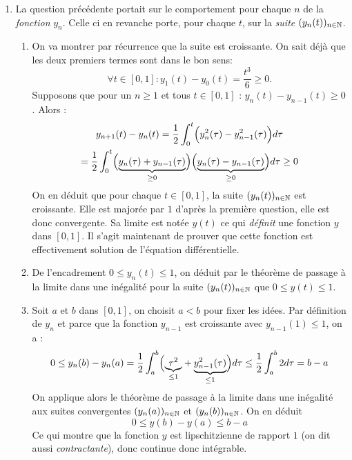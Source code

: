 \begin{enumerate}
\item La question précédente portait sur le comportement pour chaque $n$ de la \emph{fonction} $y_n$. Celle ci en revanche porte, pour chaque $t$, sur la \emph{suite} $(y_n(t))_{n\in \mathbb{N}}$. 
\begin{enumerate}
 \item On va montrer par récurrence que la suite est croissante. On sait déjà que les deux premiers termes sont dans le bon sens:
\begin{displaymath}
 \forall t\in [0,1] : y_1(t) - y_0(t) = \frac{t^3}{6} \geq 0.
\end{displaymath}
Supposons que pour un $n\geq 1$ et tous $t\in[0,1]$ : $y_n(t) - y_{n-1}(t)\geq 0$. Alors :
\begin{multline*}
 y_{n+1}(t)-y_n(t)
=\frac{1}{2}\int_0^t\Bigl(y_n^2(\tau) - y_{n-1}^2(\tau)\Bigr)d\tau\\
= \frac{1}{2}\int_0^t
\Bigl(\underset{\geq 0}{\underbrace{y_n(\tau) + y_{n-1}(\tau)}}\Bigr)
\Bigl(\underset{\geq 0}{\underbrace{y_n(\tau) - y_{n-1}(\tau)}}\Bigr)d\tau
\geq 0
\end{multline*}
On en déduit que pour chaque $t\in[0,1]$, la suite $(y_n(t))_{n\in \mathbb{N}}$ est croissante. Elle est majorée par $1$ d'après la première question, elle est donc convergente. Sa limite est notée $y(t)$ ce qui \emph{définit} une fonction $y$ dans $[0,1]$. Il s'agit maintenant de prouver que cette fonction est effectivement solution de l'équation différentielle.
\item De l'encadrement $0\leq y_n(t) \leq 1$, on déduit par le théorème de passage à la limite dans une inégalité pour la suite $(y_n(t))_{n\in \mathbb{N}}$ que $0\leq y(t) \leq 1$.
\item Soit $a$ et $b$ dans $[0,1]$, on choisit $a<b$ pour fixer les idées. Par définition de $y_n$ et parce que la fonction $y_{n-1}$ est croissante avec $y_{n-1}(1)\leq 1$, on a :
\begin{displaymath}
 0\leq y_n(b)-y_n(a)=\frac{1}{2}\int_a^b\Bigl(\underset{\leq 1}{\underbrace{\tau^2}} 
+ \underset{\leq 1}{\underbrace{y_{n-1}^2(\tau)}} \Bigr)d\tau
\leq \frac{1}{2}\int_a^b 2d\tau = b-a
\end{displaymath}
On applique alors le théorème de passage à la limite dans une inégalité aux suites convergentes $(y_n(a))_{n\in \mathbb{N}}$ et $(y_n(b))_{n\in \mathbb{N}}$. On en déduit
\begin{displaymath}
 0\leq y(b) - y(a) \leq b-a
\end{displaymath}
Ce qui montre que la fonction $y$ est lipschitzienne de rapport $1$ (on dit aussi \emph{contractante}), donc continue donc intégrable.
\end{enumerate}


\end{enumerate}
